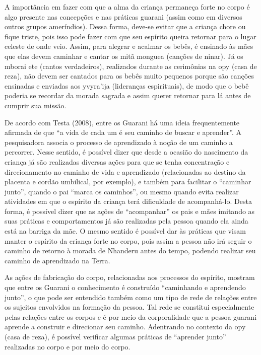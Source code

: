 A importância em fazer com que a alma da criança permaneça forte no
corpo é algo presente nas concepções e nas práticas guarani (assim como
em diversos outros grupos ameríndios). Dessa forma, deve-se evitar que a
criança chore ou fique triste, pois isso pode fazer com que seu
espírito queira retornar para o lugar celeste de onde veio. Assim, para
alegrar e acalmar os bebês, é ensinado às mães que elas devem caminhar
e cantar os mitã monguea (canções de ninar). Já os mborai ete (cantos
verdadeiros), realizados durante as cerimônias na opy (casa de reza),
não devem ser cantados para os bebês muito pequenos porque são canções
ensinadas e enviadas aos yvyra’ija (lideranças espirituais), de modo
que o bebê poderia se recordar da morada sagrada e assim querer
retornar para lá antes de cumprir sua missão.

De acordo com Testa (2008), entre os Guarani há uma ideia frequentemente
afirmada de que ``a vida de cada um é seu caminho de buscar e aprender''.
A pesquisadora associa o processo de aprendizado à noção de um caminho
a percorrer. Nesse sentido, é possível dizer que desde a ocasião do
nascimento da criança já são realizadas diversas ações para que se
tenha concentração e direcionamento no caminho de vida e aprendizado
(relacionadas ao destino da placenta e cordão umbilical, por exemplo),
e também para facilitar o ``caminhar junto'', quando o pai ``marca os
caminhos'', ou mesmo quando evita realizar atividades em que o espírito
da criança terá dificuldade de acompanhá-lo. Desta forma, é possível
dizer que as ações de ``acompanhar'' os pais e mães imitando as suas
práticas e comportamentos já são realizadas pela pessoa quando ela
ainda está na barriga da mãe. O mesmo sentido é possível dar às
práticas que visam manter o espírito da criança forte no corpo, pois
assim a pessoa não irá seguir o caminho de retorno à morada de Nhanderu
antes do tempo, podendo realizar seu caminho de aprendizado na Terra. 

As ações de fabricação do corpo, relacionadas aos processos do espírito,
mostram que entre os Guarani o conhecimento é construído ``caminhando e
aprendendo junto'', o que pode ser entendido também como um tipo de rede
de relações entre os sujeitos envolvidos na formação da pessoa. Tal
rede se constitui especialmente pelas relações entre os corpos e é por
meio da corporalidade que a pessoa guarani aprende a construir e
direcionar seu caminho. Adentrando no contexto da opy (casa de reza), é
possível verificar algumas práticas de ``aprender junto'' realizadas no
corpo e por meio do corpo.

